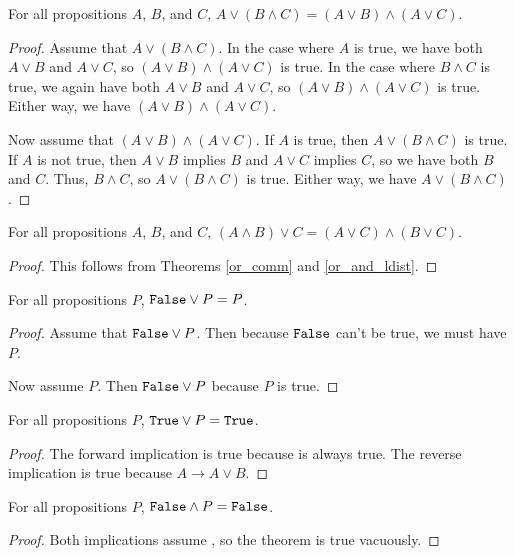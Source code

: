 \documentclass[../math.tex]{subfiles}
\begin{document}
\begin{theorem} \label{or_and_ldist}
    For all propositions $A$, $B$, and $C$, $A \vee (B \wedge C) = (A \vee B)
    \wedge (A \vee C)$.
\end{theorem}
\begin{proof}
    Assume that $A \vee (B \wedge C)$.  In the case where $A$ is true, we have
    both $A \vee B$ and $A \vee C$, so $(A \vee B) \wedge (A \vee C)$ is true.
    In the case where $B \wedge C$ is true, we again have both $A \vee B$ and $A
    \vee C$, so $(A \vee B) \wedge (A \vee C)$ is true.  Either way, we have $(A
    \vee B) \wedge (A \vee C)$.

    Now assume that $(A \vee B) \wedge (A \vee C)$.  If $A$ is true, then $A
    \vee (B \wedge C)$ is true.  If $A$ is not true, then $A \vee B$ implies
    $B$ and $A \vee C$ implies $C$, so we have both $B$ and $C$.  Thus, $B
    \wedge C$, so $A \vee (B \wedge C)$ is true.  Either way, we have $A \vee (B
    \wedge C)$.
\end{proof}

\begin{theorem} \label{or_and_rdist}
    For all propositions $A$, $B$, and $C$, $(A \wedge B) \vee C = (A \vee C)
    \wedge (B \vee C)$.
\end{theorem}
\begin{proof}
    This follows from Theorems \ref{or_comm} and \ref{or_and_ldist}.
\end{proof}

\begin{theorem} \label{or_lfalse}
    For all propositions $P$, $\vtt{False} \vee P = P$.
\end{theorem}
\begin{proof}
    Assume that $\vtt{False} \vee P$.  Then because $\vtt{False}$ can't be true,
    we must have $P$.

    Now assume $P$.  Then $\vtt{False} \vee P$ because $P$ is true.
\end{proof}

\begin{theorem} \label{or_ltrue}
    For all propositions $P$, $\vtt{True} \vee P = \vtt{True}$.
\end{theorem}
\begin{proof}
    The forward implication is true because  is always true.  The
    reverse implication is true because $A \rightarrow A \vee B$.
\end{proof}

\begin{theorem} \label{and_lfalse}
    For all propositions $P$, $\vtt{False} \wedge P = \vtt{False}$.
\end{theorem}
\begin{proof}
    Both implications assume , so the theorem is true vacuously.
\end{proof}
\end{document}
